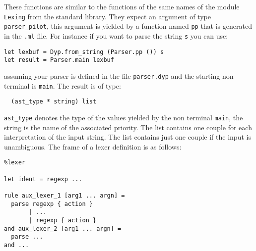 \documentclass[12pt]{article}
\begin{document}
{These functions are similar to the functions of the same names of the module \verb|Lexing| from the standard library. They expect an argument of type \verb|parser_pilot|, this argument is yielded by a function named \verb|pp| that is generated in the \verb|.ml| file. For instance if you want to parse the string \verb|s| you can use:
\begin{verbatim}
let lexbuf = Dyp.from_string (Parser.pp ()) s
let result = Parser.main lexbuf
\end{verbatim}
assuming your parser is defined in the file \verb|parser.dyp| and the starting non terminal is \verb|main|. The result is of type:
\begin{verbatim}
  (ast_type * string) list
\end{verbatim}
\verb|ast_type| denotes the type of the values yielded by the non terminal \verb|main|, the string is the name of the associated priority. The list contains one couple for each interpretation of the input string. The list contains just one couple if the input is unambiguous.
The frame of a lexer definition is as follows:
\begin{verbatim}
%lexer

let ident = regexp ...

rule aux_lexer_1 [arg1 ... argn] =
  parse regexp { action }
       | ...
       | regexp { action }
and aux_lexer_2 [arg1 ... argn] =
  parse ...
and ...


\end{verbatim}}
\end{document}
